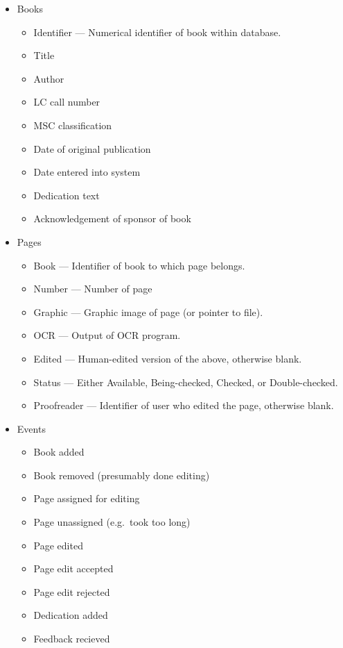 \begin{itemize}
\begin{itemize}
\begin{itemize}
\item
  Books
  \begin{itemize}
  \item
    Identifier --- Numerical identifier of book within database.
  \item
    Title 
  \item  
    Author 
  \item  
    LC call number 
  \item  
    MSC classification 
  \item  
    Date of original publication 
  \item 
    Date entered into system 
  \item  
    Dedication text 
  \item  
    Acknowledgement of sponsor of book
  \end{itemize}  
\item
  Pages 
  \begin{itemize}
  \item
    Book --- Identifier of book to which page belongs. 
  \item  
    Number --- Number of page 
  \item  
    Graphic --- Graphic image of page (or pointer to file). 
  \item  
    OCR --- Output of OCR program. 
  \item  
    Edited --- Human-edited version of the above, otherwise blank. 
  \item  
    Status --- Either Available, Being-checked, Checked, or 
    Double-checked. 
  \item  
    Proofreader --- Identifier of user who edited the page, 
    otherwise blank.
  \end{itemize}  
\item
  Events 
  \begin{itemize}
  \item
    Book added 
  \item  
    Book removed (presumably done editing) 
  \item  
    Page assigned for editing 
  \item  
    Page unassigned (e.g.~took too long) 
  \item  
    Page edited 
  \item  
    Page edit accepted 
  \item  
    Page edit rejected 
  \item  
    Dedication added
  \item
    Feedback recieved
  \end{itemize}
\end{itemize}


\end{itemize}
\end{itemize}
